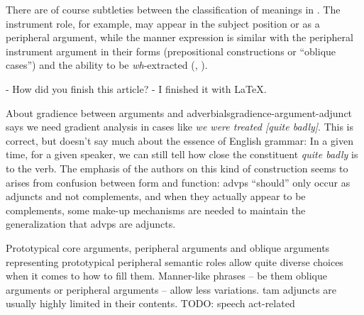 \documentclass[UTF8, a4paper, oneside, scheme=plain]{ctexrep}
\newcommand*{\citepage}[1]{pp.~{#1}}
\newcommand{\corpus}[1]{\emph{#1}}
\begin{document}
There are of course subtleties between the classification of meanings in .
The instrument role, for example, 
may appear in the subject position or as a peripheral argument, 
while the manner expression is similar with the peripheral instrument argument 
in their forms (prepositional constructions or ``oblique cases'')
and the ability to be \corpus{wh}-extracted
(, ).

\begin{exe}
    \ex\label{ex:simple-clause.dependents.ex-3} - How did you finish this article? 
    - I finished it with LaTeX.
\end{exe}

\begin{infobox}{About gradience between arguments and adverbials}{gradience-argument-adjunct}
    \citet[\citepage{732}]{quirk1985} says we need gradient analysis 
    in cases like \corpus{we were treated [quite badly]}.
    This is correct, but doesn't say much about the essence of English grammar:
    In a given time, for a given speaker,
    we can still tell how close the constituent \corpus{quite badly} is to the verb.
    The emphasis of the authors on this kind of construction 
    seems to arises from confusion between form and function:
    \acs{advp}s ``should'' only occur as adjuncts and not complements,
    and when they actually appear to be complements,
    some make-up mechanisms are needed to maintain the generalization that \acs{advp}s are adjuncts.
\end{infobox}

Prototypical core arguments,
peripheral arguments and oblique arguments representing prototypical peripheral semantic roles 
allow quite diverse choices when it comes to how to fill them.
Manner-like phrases -- be them oblique arguments or peripheral arguments -- 
allow less variations.
\acs{tam} adjuncts are usually highly limited in their contents.
TODO: speech act-related
\end{document}
